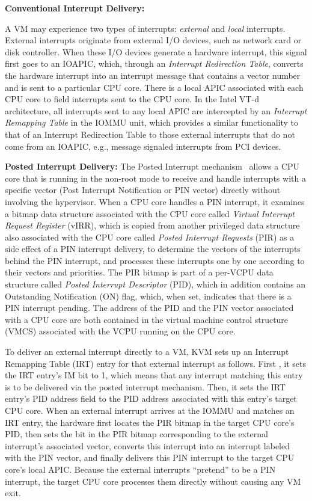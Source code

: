 {\bf Conventional Interrupt Delivery:}

A VM may experience two types of interrupts: {\em external} and {\em local} interrupts.
External interrupts originate from external I/O devices, such as network card or disk controller.
When these I/O devices generate a hardware interrupt, this signal first goes to an IOAPIC, which, through an {\em Interrupt Redirection Table},
converts the hardware interrupt into an interrupt message that contains a vector number and is sent to a particular CPU core.
There is a local APIC associated with each CPU core to field interrupts sent to the CPU core.
In the Intel VT-d architecture, all interrupts sent to any local APIC are intercepted by  an {\em Interrupt Remapping Table} in the IOMMU unit,
which provides a similar functionality to that of an Interrupt Redirection Table
to those external interrupts that do not come from an IOAPIC, e.g., message signaled interrupts from PCI devices.

{\bf Posted Interrupt Delivery:}
The Posted Interrupt mechanism~\cite{intelvtd-paper,intelvtd-manual} allows a CPU core that is running in the non-root mode to receive and handle interrupts with a specific vector
(Post Interrupt Notification or PIN vector) directly without involving the hypervisor.
When a CPU core handles a PIN interrupt, it examines a bitmap data structure associated with the CPU core called {\em Virtual Interrupt Request Register} (vIRR),
which is copied from another privileged data structure also associated with the CPU core called {\em Posted Interrupt Requests} (PIR) as a side effect of a PIN interrupt delivery,
to determine the vectors of the interrupts behind the PIN interrupt, and processes these interrupts one by one according to their vectors and priorities.
The PIR bitmap is part of a per-VCPU data structure called {\em Posted Interrupt Descriptor} (PID), which in addition contains an Outstanding Notification (ON) flag, which, when set, indicates that there is a PIN interrupt pending.
The address of the PID and the PIN vector associated with a CPU core are both contained in the virtual machine control structure (VMCS) associated with the VCPU running on the CPU core.


To deliver an external interrupt directly to a VM, KVM sets up an Interrupt Remapping Table (IRT) entry for that external interrupt as follows.
First , it sets the IRT entry's IM bit to 1, which means that any interrupt matching this entry is to be delivered via the posted interrupt mechanism.
Then, it sets the IRT entry's PID address field to the PID address associated with this entry's target CPU core.
When an external interrupt arrives at the IOMMU and matches an IRT entry, the
hardware first locates the PIR bitmap in the target CPU core's PID, then sets the bit in the PIR bitmap corresponding to the external interrupt's associated vector,
converts this interrupt into an interrupt labeled with the PIN vector, and finally delivers this PIN interrupt to the target CPU core's local APIC.
Because the external interrupts ``pretend'' to be a PIN interrupt, the target CPU core processes them directly without causing any VM exit.

